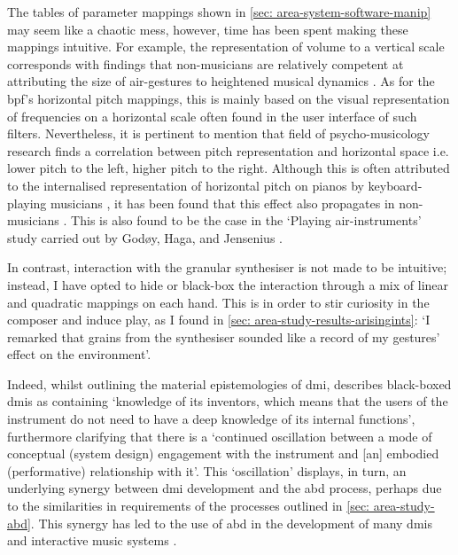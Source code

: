 The tables of parameter mappings shown in \autoref{sec: area-system-software-manip} may seem like a chaotic mess, however, time has been spent making these mappings intuitive. For example, the representation of volume to a vertical scale corresponds with findings that non-musicians are relatively competent at attributing the size of air-gestures to heightened musical dynamics \citep{godoy2006,caramiaux2010}. As for the \gls{bpf}'s horizontal pitch mappings, this is mainly based on the visual representation of frequencies on a horizontal scale often found in the user interface of such filters. Nevertheless, it is pertinent to mention that field of psycho-musicology research \citep{timmers2016} finds a correlation between pitch representation and horizontal space i.e. lower pitch to the left, higher pitch to the right. Although this is often attributed to the internalised representation of horizontal pitch on pianos by keyboard-playing musicians \citep{lidji2007,rusconi2006}, it has been found that this effect also propagates in non-musicians \citep{weis2016}. This is also found to be the case in the `Playing air-instruments' study carried out by Godøy, Haga, and Jensenius \citeyearpar{godoy2006}.

In contrast, interaction with the granular synthesiser is not made to be intuitive; instead, I have opted to hide or black-box the interaction through a mix of linear and quadratic mappings on each hand. This is in order to stir curiosity in the composer and induce play, as I found in \autoref{sec: area-study-results-arisingints}: `I remarked that grains from the synthesiser sounded like a record of my gestures' effect on the environment'.

Indeed, whilst outlining the material epistemologies of \gls{dmi}, \citep{magnusson2009} describes black-boxed \glspl{dmi} as containing `knowledge of its inventors, which means that the users of the instrument do not need to have a deep knowledge of its internal functions', furthermore clarifying that there is a `continued oscillation between a mode of conceptual (system design) engagement with the instrument and [an] embodied (performative) relationship with it'. This `oscillation' displays, in turn, an underlying synergy between \gls{dmi} development and the \gls{abd} process, perhaps due to the similarities in requirements of the processes outlined in \autoref{sec: area-study-abd}. This synergy has led to the use of \gls{abd} in the development of many \glspl{dmi} and interactive music systems \citep{kiefer2020,martin2017,turchet2018,unander-scharin2014}.

